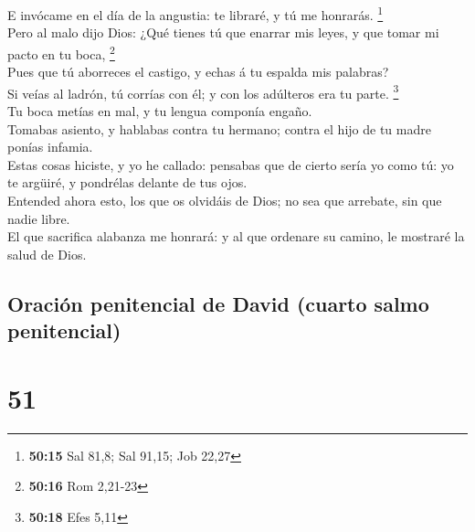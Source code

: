  E invócame en el día de la angustia: te libraré, y tú me
honrarás. \footnote{\textbf{50:15} Sal 81,8; Sal 91,15; Job 22,27}\\
 Pero al malo dijo Dios: ¿Qué tienes tú que enarrar mis
leyes, y que tomar mi pacto en tu boca, \footnote{\textbf{50:16} Rom
  2,21-23}\\
 Pues que tú aborreces el castigo, y echas á tu espalda
mis palabras?\\
 Si veías al ladrón, tú corrías con él; y con los
adúlteros era tu parte. \footnote{\textbf{50:18} Efes 5,11}\\
 Tu boca metías en mal, y tu lengua componía engaño.\\
 Tomabas asiento, y hablabas contra tu hermano; contra el
hijo de tu madre ponías infamia.\\
 Estas cosas hiciste, y yo he callado: pensabas que de
cierto sería yo como tú: yo te argüiré, y pondrélas delante de tus
ojos.\\
 Entended ahora esto, los que os olvidáis de Dios; no sea
que arrebate, sin que nadie libre.\\
 El que sacrifica alabanza me honrará: y al que ordenare
su camino, le mostraré la salud de Dios.

\hypertarget{oraciuxf3n-penitencial-de-david-cuarto-salmo-penitencial}{%
\subsection{Oración penitencial de David (cuarto salmo
penitencial)}\label{oraciuxf3n-penitencial-de-david-cuarto-salmo-penitencial}}

\hypertarget{section-50}{%
\section{51}\label{section-50}}

